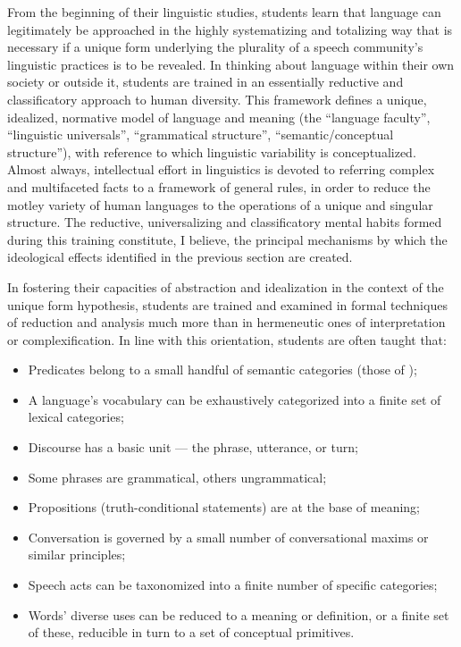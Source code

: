 \documentclass[output=paper]{langscibook}
\begin{document}
From the beginning of their linguistic studies, students learn that language can legitimately be approached in the highly systematizing and totalizing way that is necessary if a unique form underlying the plurality of a speech community's linguistic practices is to be revealed. In thinking about language within their own society or outside it, students are trained in an essentially reductive and classificatory approach to human diversity. This framework defines a unique, idealized, normative model of language and meaning (the ``language faculty'', ``linguistic universals'', ``grammatical structure'', ``semantic/conceptual structure''), with reference to which linguistic variability is conceptualized. Almost always, intellectual effort in linguistics is devoted to referring complex and multifaceted facts to a framework of general rules, in order to reduce the motley variety of human languages to the operations of a unique and singular structure. The reductive, universalizing and classificatory mental habits formed during this training constitute, I believe, the principal mechanisms by which the ideological effects identified in the previous section are created.

In fostering their capacities of abstraction and idealization in the context of the unique form hypothesis, students are trained and examined in formal techniques of reduction and analysis much more than in hermeneutic ones of interpretation or complexification. In line with this orientation, students are often taught that:

\begin{itemize}
    \item Predicates belong to a small handful of semantic categories (those of \citealt{Vendler1957});
    \item A language's vocabulary can be exhaustively categorized into a finite set of lexical categories;
    \item Discourse has a basic unit — the phrase, utterance, or turn;
    \item Some phrases are grammatical, others ungrammatical;
    \item Propositions (truth-conditional statements) are at the base of meaning;
    \item Conversation is governed by a small number of conversational maxims or similar principles;
    \item Speech acts can be taxonomized into a finite number of specific categories;
    \item Words' diverse uses can be reduced to a meaning or definition, or a finite set of these, reducible in turn to a set of conceptual primitives.
\end{itemize}
\end{document}
